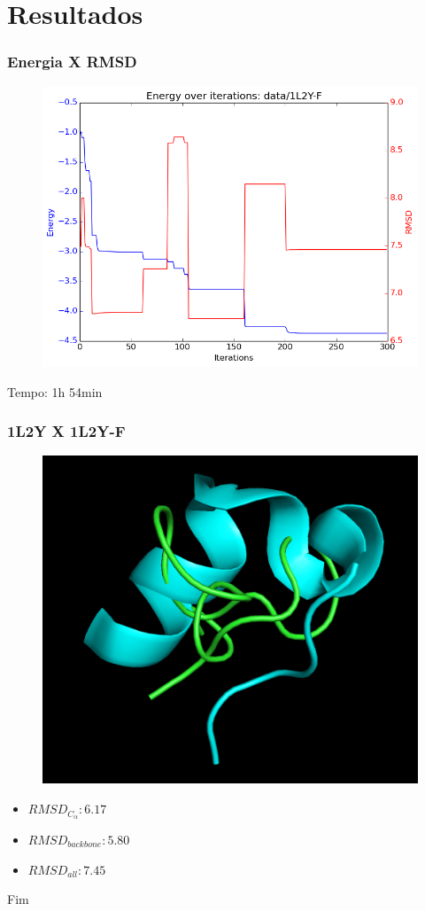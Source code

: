 \documentclass{beamer}
\begin{document}
\section{Resultados} %

\begin{frame}
\frametitle{Energia X RMSD}
\begin{figure}
\includegraphics[width=0.7\linewidth]{1L2Y-F_energy.png}
\end{figure}
Tempo: 1h 54min
\end{frame}

\begin{frame}
\frametitle{1L2Y X 1L2Y-F}
\begin{figure}
\includegraphics[width=0.4\linewidth]{1L2Y-F.png}
\end{figure}
\begin{itemize}
  \item $RMSD_{C_\alpha}: 6.17$
  \item $RMSD_{backbone}: 5.80$
  \item $RMSD_{all}: 7.45$ 
\end{itemize}
\end{frame}

\begin{frame}
\Huge{\centerline{Fim}}
\end{frame}

\end{document}
